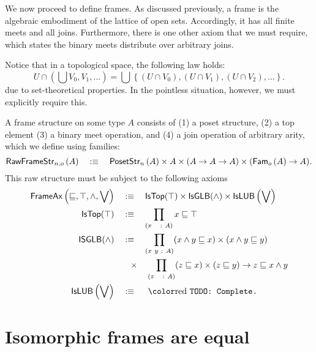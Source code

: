 We now proceed to define frames. As discussed previously, a frame is the algebraic
embodiment of the lattice of open sets. Accordingly, it has all finite meets and all
joins. Furthermore, there is one other axiom that we must require, which states the binary
meets distribute over arbitrary joins.

Notice that in a topological space, the following law holds:
\begin{equation*}
  U \cap \left( \bigcup V_0, V_1, \ldots \right) = \bigcup\left\{ (U \cap V_0), (U \cap V_1), (U \cap V_2) , \ldots \right\}.
\end{equation*}
due to set-theoretical properties. In the pointless situation, however, we must explicitly
require this.

\begin{defn}[Frame]\label{defn:frame}
  A frame structure on some type $A$ consists of (1) a poset structure, (2) a top element
  (3) a binary meet operation, and (4) a join operation of arbitrary arity, which we
  define using families:
  \begin{equation*}
    \mathsf{RawFrameStr}{}_{n, o}\left(A\right) \quad:\equiv\quad \mathsf{PosetStr}{}_{n}\left(A\right) \times A \times (A \rightarrow A \rightarrow A) \times (\mathsf{Fam}_{o}\left(A\right) \rightarrow A).
  \end{equation*}
  This raw structure must be subject to the following axioms
  \begin{align*}
    \frameax{\sqsubseteq, \top, \wedge, \bigvee} \quad&\is\quad
      \mathsf{IsTop}(\top) \times \mathsf{IsGLB}(\wedge) \times \mathsf{IsLUB}\left(\bigvee\right)\\
    \mathsf{IsTop}(\top) \quad&\is\quad \pity{x~~}{A}{x \sqsubseteq \top}\\
    \mathsf{ISGLB}(\wedge) \quad&\is\quad \pity{x~y}{A}{(x \wedge y \sqsubseteq x) \times (x \wedge y \sqsubseteq y)}\\
                       &\hspace{0.7em}\times\quad \pity{z~~}{A}{(z \sqsubseteq x) \times (z \sqsubseteq y) \rightarrow z \sqsubseteq x \wedge y}\\
    \mathsf{IsLUB}\left(\bigvee\right) \quad&\is\quad \text{\todo{Complete.}}
  \end{align*}
\end{defn}

\section{Isomorphic frames are equal}\label{sec:frame-univ}


